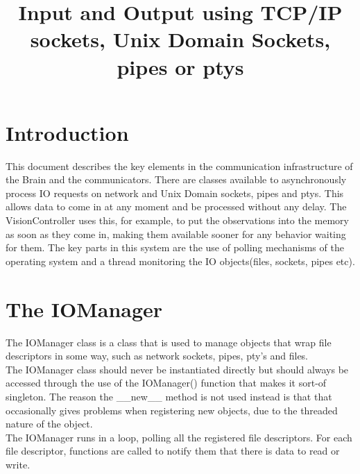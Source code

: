 \documentclass[a4paper, 10pt, oneside]{article}
\title{Input and Output using TCP/IP sockets, Unix Domain Sockets, pipes or ptys}
\begin{document}
\maketitle

\lstset{ 
    basicstyle=\footnotesize,  
}

\tableofcontents

\section{Introduction}
This document describes the key elements in the communication infrastructure of
the Brain and the communicators. There are classes available to asynchronously
process IO requests on network and Unix Domain sockets, pipes and ptys. This
allows data to come in at any moment and be processed without any delay. The
VisionController uses this, for example, to put the observations into the memory
as soon as they come in, making them available sooner for any behavior waiting
for them. The key parts in this system are the use of polling mechanisms of
the operating system and a thread monitoring the IO objects(files, sockets,
pipes etc).

\section{The IOManager}
The IOManager class is a class that is used to manage objects that wrap file
descriptors in some way, such as network sockets, pipes, pty's and files.\\

The IOManager class should never be instantiated directly but should always be
accessed through the use of the IOManager() function that makes it sort-of
singleton. The reason the \_\_new\_\_ method is not used instead is that that
occasionally gives problems when registering new objects, due to the threaded
nature of the object.\\

The IOManager runs in a loop, polling all the registered file descriptors.  For
each file descriptor, functions are called to notify them that there is data to
read or write.\\
\end{document}
